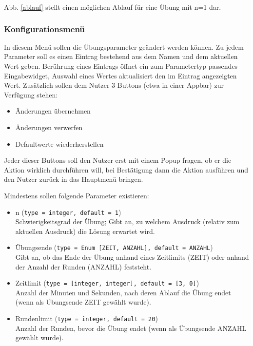 \noindent Abb. \ref{ablauf} stellt einen möglichen Ablauf für eine Übung mit
n=1 dar.

\subsubsection{Konfigurationsmenü}
\label{konfig}
In diesem Menü sollen die Übungsparameter geändert werden können.
Zu jedem Parameter soll es einen Eintrag bestehend aus dem Namen und dem aktuellen Wert geben.
Berührung eines Eintrags öffnet ein zum Parametertyp passendes Eingabewidget, Auswahl eines Wertes aktualisiert den
im Eintrag angezeigten Wert.
Zusätzlich sollen dem Nutzer 3 Buttons (etwa in einer Appbar) zur Verfügung stehen:
\begin{itemize}[itemsep=0pt]
  \item Änderungen übernehmen
  \item Änderungen verwerfen
  \item Defaultwerte wiederherstellen
\end{itemize}
Jeder dieser Buttons soll den Nutzer erst mit einem Popup fragen, ob er die Aktion
wirklich durchführen will, bei Bestätigung dann die Aktion ausführen und den
Nutzer zurück in das Hauptmenü bringen.

\begin{samepage}
\noindent Mindestens sollen folgende Parameter existieren:
\begin{itemize}[itemsep=0pt]
  \item n (\texttt{type = integer, default = 1})\\
  Schwierigkeitsgrad der Übung; Gibt an, zu welchem Ausdruck (relativ zum aktuellen Ausdruck) die Lösung erwartet wird.
  \item Übungsende (\texttt{type = Enum [ZEIT, ANZAHL], default = ANZAHL})\\
  Gibt an, ob das Ende der Übung anhand eines Zeitlimits (ZEIT) oder anhand der Anzahl der Runden (ANZAHL) feststeht.
  \item Zeitlimit (\texttt{type = [integer, integer], default = [3, 0]})\\
  Anzahl der Minuten und Sekunden, nach deren Ablauf die Übung endet (wenn als Übungsende ZEIT gewählt wurde).
  \item Rundenlimit (\texttt{type = integer, default = 20})\\
  Anzahl der Runden, bevor die Übung endet (wenn als Übungsende ANZAHL gewählt wurde).
\end{itemize}
\end{samepage}

